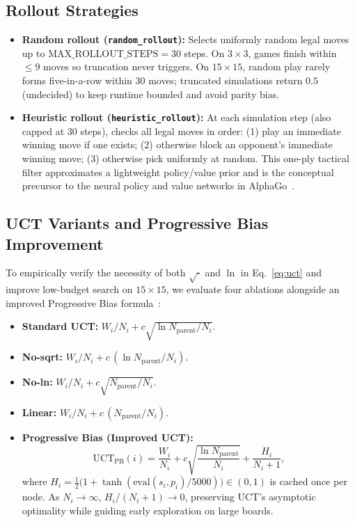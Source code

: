 \documentclass[conference]{IEEEtran}
\begin{document}
\subsection{Rollout Strategies}
\begin{itemize}
    \item \textbf{Random rollout (\texttt{random\_rollout}):} Selects uniformly random legal moves up to $\text{MAX\_ROLLOUT\_STEPS} = 30$ steps. On $3\times 3$, games finish within $\le 9$ moves so truncation never triggers. On $15\times 15$, random play rarely forms five-in-a-row within $30$ moves; truncated simulations return $0.5$ (undecided) to keep runtime bounded and avoid parity bias.
    \item \textbf{Heuristic rollout (\texttt{heuristic\_rollout}):} At each simulation step (also capped at $30$ steps), checks all legal moves in order: (1) play an immediate winning move if one exists; (2) otherwise block an opponent's immediate winning move; (3) otherwise pick uniformly at random. This one-ply tactical filter approximates a lightweight policy/value prior and is the conceptual precursor to the neural policy and value networks in AlphaGo~\cite{silver2016}.
\end{itemize}

\subsection{UCT Variants and Progressive Bias Improvement}
To empirically verify the necessity of both $\sqrt{\cdot}$ and $\ln$ in Eq.~\eqref{eq:uct} and improve low-budget search on $15\times 15$, we evaluate four ablations alongside an improved Progressive Bias formula~\cite{chaslot2008}:
\begin{itemize}
    \item \textbf{Standard UCT:} $W_i/N_i + c\sqrt{\ln N_{\mathrm{parent}} / N_i}$.
    \item \textbf{No-sqrt:} $W_i/N_i + c\,(\ln N_{\mathrm{parent}} / N_i)$.
    \item \textbf{No-ln:} $W_i/N_i + c\sqrt{N_{\mathrm{parent}} / N_i}$.
    \item \textbf{Linear:} $W_i/N_i + c\,(N_{\mathrm{parent}} / N_i)$.
    \item \textbf{Progressive Bias (Improved UCT):}
    \begin{equation}
    \text{UCT}_{\mathrm{PB}}(i) = \frac{W_i}{N_i} + c\sqrt{\frac{\ln N_{\mathrm{parent}}}{N_i}} + \frac{H_i}{N_i + 1},
    \end{equation}
    where $H_i = \frac{1}{2}\bigl(1 + \tanh(\text{eval}(s_i, p_i)/5000)\bigr) \in (0, 1)$ is cached once per node. As $N_i \to \infty$, $H_i/(N_i+1) \to 0$, preserving UCT's asymptotic optimality while guiding early exploration on large boards.
\end{itemize}
\end{document}
